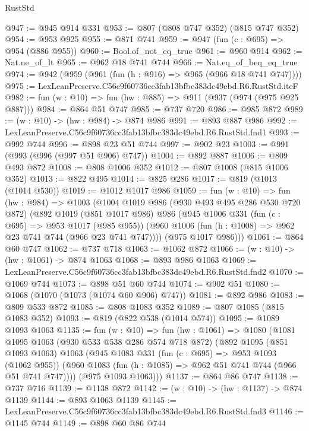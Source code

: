 \begin{lexlean}{RustStd}
\begin{coremodule}
@947 := @945 @914 @331
@953 := @807 (@808 @747 @352) (@815 @747 @352)
@954 := @953 @925
@955 := @871 @741
@959 := @947 (fun (c : @695) => @954 (@886 @955))
@960 := Bool.of_not_eq_true
@961 := @960 @914
@962 := Nat.ne_of_lt
@965 := @962 @18 @741 @744
@966 := Nat.eq_of_beq_eq_true
@974 := @942 (@959 (@961 (fun (h : @916) => @965 (@966 @18 @741 @747))))
@975 := LexLeanPreserve.C56c9f60736cc3fab13bfbc383dc49ebd.R6.RustStd.iteF
@982 := fun (w : @10) => fun (hw : @885) => @911 (@937 (@974 (@975 @925 @887)))
@984 := @864 @51 @747
@985 := @737 @720
@986 := @985 @872
@989 := (w : @10) -> (hw : @984) -> @874 @986
@991 := @893 @887 @986
@992 := LexLeanPreserve.C56c9f60736cc3fab13bfbc383dc49ebd.R6.RustStd.fnd1
@993 := @992 @744
@996 := @898 @23 @51 @744
@997 := @902 @23
@1003 := @991 (@993 (@996 (@997 @51 @906) @747))
@1004 := @892 @887
@1006 := @809 @493 @872
@1008 := @808 @1006 @352
@1012 := @807 @1008 (@815 @1006 @352)
@1013 := @822 @495
@1014 := @825 @286
@1017 := @819 (@1013 (@1014 @530))
@1019 := @1012 @1017 @986
@1059 := fun (w : @10) =>
  fun (hw : @984) =>
  @1003
    (@1004
      @1019
      @986
      (@930 @493 @495 @286 @530 @720 @872)
      (@892
        @1019
        (@851 @1017 @986)
        @986
        (@945
          @1006
          @331
          (fun (c : @695) => @953 @1017 (@985 @955))
          (@960 @1006 (fun (h : @1008) => @962 @23 @741 @744 (@966 @23 @741 @747))))
        (@975 @1017 @986)))
@1061 := @864 @60 @747
@1062 := @737 @718
@1063 := @1062 @872
@1066 := (w : @10) -> (hw : @1061) -> @874 @1063
@1068 := @893 @986 @1063
@1069 := LexLeanPreserve.C56c9f60736cc3fab13bfbc383dc49ebd.R6.RustStd.fnd2
@1070 := @1069 @744
@1073 := @898 @51 @60 @744
@1074 := @902 @51
@1080 := @1068 (@1070 (@1073 (@1074 @60 @906) @747))
@1081 := @892 @986
@1083 := @809 @533 @872
@1085 := @808 @1083 @352
@1089 := @807 @1085 (@815 @1083 @352)
@1093 := @819 (@822 @538 (@1014 @574))
@1095 := @1089 @1093 @1063
@1135 := fun (w : @10) =>
  fun (hw : @1061) =>
  @1080
    (@1081
      @1095
      @1063
      (@930 @533 @538 @286 @574 @718 @872)
      (@892
        @1095
        (@851 @1093 @1063)
        @1063
        (@945
          @1083
          @331
          (fun (c : @695) => @953 @1093 (@1062 @955))
          (@960 @1083 (fun (h : @1085) => @962 @51 @741 @744 (@966 @51 @741 @747))))
        (@975 @1093 @1063)))
@1137 := @864 @86 @747
@1138 := @737 @716
@1139 := @1138 @872
@1142 := (w : @10) -> (hw : @1137) -> @874 @1139
@1144 := @893 @1063 @1139
@1145 := LexLeanPreserve.C56c9f60736cc3fab13bfbc383dc49ebd.R6.RustStd.fnd3
@1146 := @1145 @744
@1149 := @898 @60 @86 @744

\end{coremodule}
\end{lexlean}
